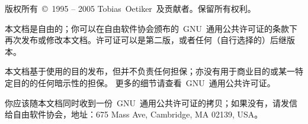 \thispagestyle{empty}

\newlength{\centeroffset}
\setlength{\centeroffset}{-0.5\oddsidemargin}
\addtolength{\centeroffset}{0.5\evensidemargin}

\noindent\hspace*{\centeroffset}

\noindent\hspace*{\centeroffset}


\newpage\thispagestyle{empty}
\begingroup\small
版权所有~\copyright\ 1995 -- 2005 Tobias\ Oetiker~及贡献者。保留所有权利。

本文档是自由的；你可以在自由软件协会颁布的~GNU~通用公共许可证的条款下
再次发布或修改本文档。许可证可以是第二版，或者任何（自行选择的）后继版本。

本文档基于使用的目的发布，但并不负责任何担保；亦没有用于商业目的或某一特定目的的任何暗示性的担保。
更多的细节请查看~GNU~通用公共许可证。

你应该随本文档同时收到一份~GNU~通用公共许可证的拷贝；如果没有，请发信
给自由软件协会，地址：675 Mass Ave, Cambridge, MA 02139, USA。

\endgroup